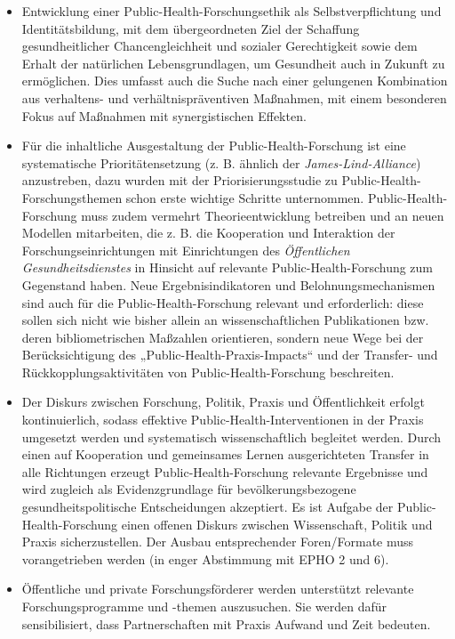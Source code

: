 \documentclass{article}
\begin{document}
\begin{itemize}
\item Entwicklung einer Public-Health-Forschungsethik als Selbstverpflichtung und Identitätsbildung, mit dem übergeordneten Ziel der Schaffung gesundheitlicher Chancengleichheit und sozialer Gerechtigkeit sowie dem Erhalt der natürlichen Lebensgrundlagen, um Gesundheit auch in Zukunft zu ermöglichen. Dies umfasst auch die Suche nach einer gelungenen Kombination aus verhaltens- und verhältnispräventiven Maßnahmen, mit einem besonderen Fokus auf Maßnahmen mit synergistischen Effekten.


\item Für die inhaltliche Ausgestaltung der Public-Health-Forschung ist eine systematische Prioritätensetzung (z. B. ähnlich der \emph{James-Lind-Alliance}) anzustreben, dazu wurden mit der Priorisierungsstudie zu Public-Health-Forschungsthemen schon erste wichtige Schritte unternommen. Public-Health-Forschung muss zudem vermehrt Theorieentwicklung betreiben und an neuen Modellen mitarbeiten, die z. B. die Kooperation und Interaktion der Forschungseinrichtungen mit Einrichtungen des \emph{Öffentlichen Gesundheitsdienstes} in Hinsicht auf relevante Public-Health-Forschung zum Gegenstand haben. Neue Ergebnisindikatoren und Belohnungsmechanismen sind auch für die Public-Health-Forschung relevant und erforderlich: diese sollen sich nicht wie bisher allein an wissenschaftlichen Publikationen bzw. deren bibliometrischen Maßzahlen orientieren, sondern neue Wege bei der Berücksichtigung des „Public-Health-Praxis-Impacts“ und der Transfer- und Rückkopplungsaktivitäten von Public-Health-Forschung beschreiten.


\item Der Diskurs zwischen Forschung, Politik, Praxis und Öffentlichkeit erfolgt kontinuierlich, sodass effektive Public-Health-Interventionen in der Praxis umgesetzt werden und systematisch wissenschaftlich begleitet werden. Durch einen auf Kooperation und gemeinsames Lernen ausgerichteten Transfer in alle Richtungen erzeugt Public-Health-Forschung relevante Ergebnisse und wird zugleich als Evidenzgrundlage für bevölkerungsbezogene gesundheitspolitische Entscheidungen akzeptiert. Es ist Aufgabe der Public-Health-Forschung einen offenen Diskurs zwischen Wissenschaft, Politik und Praxis sicherzustellen. Der Ausbau entsprechender Foren/Formate muss vorangetrieben werden (in enger Abstimmung mit EPHO 2 und 6).


\item Öffentliche und private Forschungsförderer werden unterstützt relevante Forschungsprogramme und -themen auszusuchen. Sie werden dafür sensibilisiert, dass Partnerschaften mit Praxis Aufwand und Zeit bedeuten.


\end{itemize}
\end{document}
